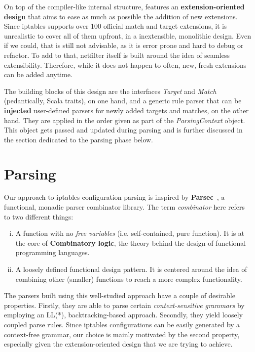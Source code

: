 On top of the compiler-like internal structure, \TOOL features an
\textbf{extension-oriented design} that aims to ease as much as possible the
addition of new extensions. Since iptables supports over 100 official match and
target extensions, it is unrealistic to cover all of them upfront, in a
inextensible, monolithic design.  Even if we could, that is still not
advisable, as it is error prone and hard to debug or refactor.  To add to that,
netfilter itself is built around the idea of seamless extensibility.
Therefore, while it does not happen to often, new, fresh extensions can be
added anytime.

The building blocks of this design are the interfaces \emph{Target} and
\emph{Match} (pedantically, Scala traits), on one hand, and a generic rule
parser that can be \textbf{injected} user-defined parsers for newly added
targets and matches, on the other hand.  They are applied in the order given as
part of the \emph{ParsingContext} object.  This object gets passed and updated
during parsing and is further discussed in the section dedicated to the parsing
phase below.


\section{Parsing}\label{sec:parsing}

Our approach to iptables configuration parsing is inspired by
\textbf{Parsec}~\cite{leijen2002parsec}, a functional, monadic parser
combinator library.  The term \emph{combinator} here refers to two different
things:
\begin{enumerate}[(i)]
  \item A function with no \emph{free variables} (i.e. self-contained, pure
    function).  It is at the core of \textbf{Combinatory logic}, the theory
    behind the design of functional programming languages.
  \item A loosely defined functional design pattern.  It is centered around the
    idea of combining other (smaller) functions to reach a more complex
    functionality.
\end{enumerate}

The parsers built using this well-studied approach have a couple of desirable
properties.  Firstly, they are able to parse certain \emph{context-sensitive
grammars} by employing an LL(*), backtracking-based approach.  Secondly, they
yield loosely coupled parse rules.  Since iptables configurations can be easily
generated by a context-free grammar, our choice is mainly motivated by the
second property, especially given the extension-oriented design that we are
trying to achieve.

